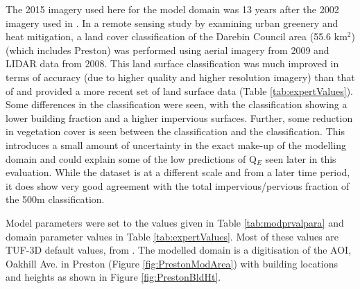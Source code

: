 \documentclass[final,3p,times,authoryear]{elsarticle}
\begin{document}
The 2015 imagery used here for the model domain was 13 years after the 2002 imagery used in \cite{Coutts2007}. In a remote sensing study by \cite{Nury2015} examining urban greenery and heat mitigation, a land cover classification of the Darebin Council area (55.6 km$^{2}$) (which includes Preston) was performed using aerial imagery from 2009 and LIDAR data from 2008. This land surface classification was much improved in terms of accuracy (due to higher quality and higher resolution imagery) than that of \cite{Coutts2007} and provided a more recent set of land surface data (Table \ref{tab:expertValues}). Some differences in the classification were seen, with the \cite{Nury2015} classification showing a lower building fraction and a higher impervious surfaces. Further, some reduction in vegetation cover is seen between the \cite{Coutts2007} classification and the \cite{Nury2015} classification. This introduces a small amount of uncertainty in the exact make-up of the modelling domain and could explain some of the low predictions of Q$_{E}$ seen later in this evaluation. While the \cite{Nury2015} dataset is at a different scale and from a later time period, it does show very good agreement with the total impervious/pervious fraction of the 500m classification.


Model parameters were set to the values given in Table \ref{tab:modprvalpara} and domain parameter values in Table \ref{tab:expertValues}. Most of these values are TUF-3D default values, from \cite{Krayenhoff2007}. The modelled domain is a digitisation of the AOI, Oakhill Ave. in Preston (Figure \ref{fig:PrestonModArea}) with building locations and heights as shown in Figure \ref{fig:PrestonBldHt}.
\end{document}
